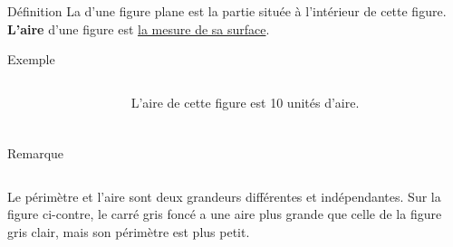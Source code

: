 \documentclass[xcolor=table]{beamer}
\begin{document}
\begin{frame}
	\frametitle{ }  
	\framesubtitle{ }	
	
	\begin{exampleblock}{Définition}
		La  d'une figure plane est la partie située à l'intérieur de cette figure. \textbf{L'aire} d'une figure est \underline{la mesure de sa surface}.
	\end{exampleblock}
	
	\begin{block}{Exemple}
		\begin{columns}[onlytextwidth]
			\begin{column}{0.465\textwidth}
			\end{column}
			\begin{column}{0.465\textwidth}
				L'aire de cette figure est 10 unités d'aire.			
			\end{column}
		\end{columns}
		
	\end{block}	
	
	
\end{frame}



\begin{frame}
	\frametitle{ }  
	\framesubtitle{ }	
	
	\begin{block}{Remarque}
		\begin{columns}[onlytextwidth]
			\begin{column}{0.465\textwidth}
				Le périmètre et l'aire sont deux grandeurs différentes et indépendantes. Sur la figure ci-contre, le carré gris foncé a une aire plus grande que celle de la figure gris clair, mais son périmètre est plus petit.			
			\end{column}
			\begin{column}{0.465\textwidth}
			\end{column}
			
		\end{columns}
		
	\end{block}	
	
	
\end{frame}
\end{document}
